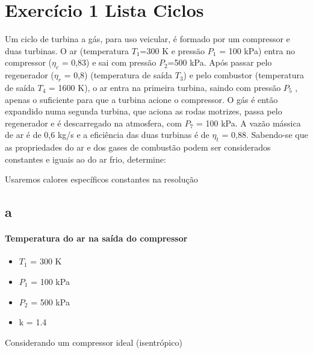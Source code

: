 \section{Exercício 1 Lista Ciclos}
Um ciclo de turbina a gás, para uso veicular, é formado por um compressor e duas
turbinas. O ar (temperatura $T_{1}$=300 K e pressão $P_{1}$ = 100 kPa) entra no compressor ($\eta _{c}$ = 0,83) e sai com pressão $P_{2}$=500 kPa. Após passar pelo regenerador ($\eta _{r}$ = 0,8) (temperatura de saída $T_{3}$) e pelo combustor (temperatura de saída $T_{4}$ = 1600 K), o ar entra na primeira turbina, saindo com pressão $P_{5}$ , apenas o suficiente para que a turbina acione o compressor. O gás é então expandido numa segunda turbina, que aciona as rodas motrizes, passa pelo regenerador e é descarregado na atmosfera, com $P_{7}$ = 100 kPa. A vazão mássica de ar é de 0,6 kg/s e a eficiência das duas turbinas é de $\eta _{t}$ = 0,88. Sabendo-se que as propriedades do ar e dos gases de combustão podem ser considerados constantes e iguais ao do ar frio, determine:



\pagebreak

Usaremos calores específicos constantes na resolução

\subsection{a}
\paragraph*{Temperatura do ar na saída do compressor}

\begin{itemize}
\item $T_{1}$ = 300 K
\item $P_{1}$ = 100 kPa
\item $P_{2}$ = 500 kPa
\item k = 1.4
\end{itemize}

Considerando um compressor ideal (isentrópico)


